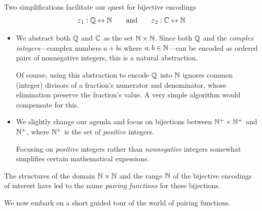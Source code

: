\noindent
Two simplifications facilitate our quest for bijective encodings
\[ \varepsilon_1: \Q \leftrightarrow \N \ \ \ \ \ \mbox{ and }
\ \ \ \ \ \varepsilon_2: \C \leftrightarrow \N
\]
\begin{itemize}
\item
We abstract both $\mathbb{Q}$ and $\mathbb{C}$ as the set $\mathbb{N} \times \mathbb{N}$.  Since both
$\mathbb{Q}$ and the 
%
{\it complex integers}---complex numbers $a+bi$ where $a,b \in
\mathbb{N}$---can be encoded as ordered pairs of nonnegative integers, this is
a natural abstraction.

Of course, using this abstraction to encode $\mathbb{Q}$ into $\mathbb{N}$ ignores
common (integer) divisors of a fraction's numerator and denominator,
whose elimination preserve the fraction's value.  A very simple
algorithm would compensate for this.

\item
We slightly change our agenda and focus on bijections between $\mathbb{N}^+
\times \mathbb{N}^+$ and $\mathbb{N}^+$, where $\mathbb{N}^+$ is the set of {\em positive}
integers.

Focusing on {\em positive} integers rather than {\em nonnegative}
integers somewhat simplifies certain mathematical expessions.
\end{itemize}
The structures of the domain $\mathbb{N} \times \mathbb{N}$ and the range $\mathbb{N}$ of the
bijective encodings of interest have led to the name {\it pairing
  functions}
for these bijections.

\smallskip

We now embark on a short guided tour of the world of pairing
functions.

\medskip

